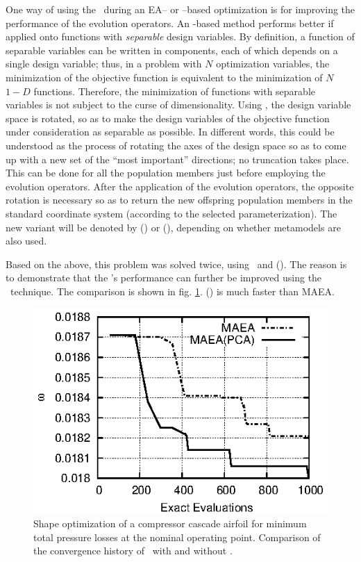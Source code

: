 \documentclass{vki_ls}
\begin{document}
One way of using the \PCA\ during an EA-- or \MAEA--based optimization is for improving the performance of the evolution operators. An \EA\--based method performs better if applied onto functions with \textit{separable} design variables. By definition, a function of separable variables can be written in components, each of which depends on a single design variable; thus, in a problem with $N$ optimization variables, the minimization of the objective function is equivalent to the minimization of $N$ $1\!-\!D$ functions. Therefore, the minimization of functions with separable variables is not subject to the curse of dimensionality. Using \PCA, the design variable space is rotated, so as to make the design variables of the objective function under consideration as separable as possible. In different words, this could be understood as the process of rotating the axes of the design space so as to come up with a new set of the ``most important'' directions; no truncation takes place. This can be done for all the population members just before employing the evolution operators. After the application of the evolution operators, the opposite rotation is necessary so as to return the new offspring population members in the standard coordinate system (according to the selected parameterization). The new variant will be denoted by \EA(\PCA) or \MAEA(\PCA), depending on whether metamodels are also used.

Based on the above, this problem was solved twice, using \MAEA\ and \MAEA(\PCA). The reason is to demonstrate that the \MAEA's performance can further be improved using the \PCA\ technique. The comparison is shown in fig. \ref{f:PCAcasc}. \MAEA(\PCA) is much faster than MAEA.

\begin{figure}[!ht]
    \centering
    \includegraphics[scale=1.4]{maeas/CascPCA.eps}
    \caption{Shape optimization of a compressor cascade airfoil for minimum 
	     total pressure losses at the nominal operating point. 
	     Comparison of the convergence history of \MAEA\ with and without 
	     \PCA.}
    \label{f:PCAcasc}
\end{figure}
\end{document}
